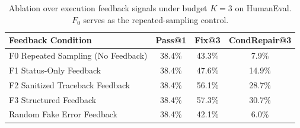 \begin{table}[t]
\centering\small
\begin{tabular}{lccc}
\toprule
\textbf{Feedback Condition} & \textbf{Pass@1} & \textbf{Fix@3} & \textbf{CondRepair@3} \\
\midrule
F0 Repeated Sampling (No Feedback) & 38.4\% & 43.3\% & 7.9\% \\
F1 Status-Only Feedback & 38.4\% & 47.6\% & 14.9\% \\
F2 Sanitized Traceback Feedback & 38.4\% & 56.1\% & 28.7\% \\
F3 Structured Feedback & 38.4\% & 57.3\% & 30.7\% \\
Random Fake Error Feedback & 38.4\% & 42.1\% & 6.0\% \\
\bottomrule
\end{tabular}
\caption{Ablation over execution feedback signals under budget $K=3$ on HumanEval. $F_0$ serves as the repeated-sampling control.}
\label{tab:feedback_ablation}
\end{table}
